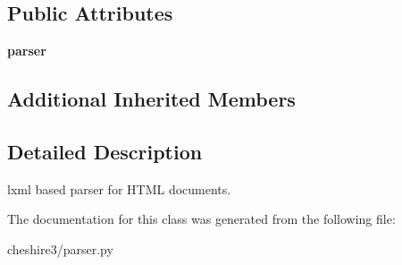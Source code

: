\subsection*{Public Attributes}
\begin{DoxyCompactItemize}
\item 
\hypertarget{classcheshire3_1_1parser_1_1_lxml_html_parser_a037db27adbeee69398ebe2a072303a9f}{{\bfseries parser}}\label{classcheshire3_1_1parser_1_1_lxml_html_parser_a037db27adbeee69398ebe2a072303a9f}

\end{DoxyCompactItemize}
\subsection*{Additional Inherited Members}


\subsection{Detailed Description}
\begin{DoxyVerb}lxml based parser for HTML documents.\end{DoxyVerb}
 

The documentation for this class was generated from the following file\-:\begin{DoxyCompactItemize}
\item 
cheshire3/parser.\-py\end{DoxyCompactItemize}
